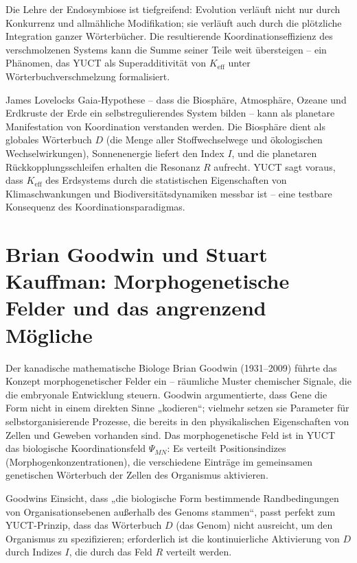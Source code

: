 \documentclass[12pt,a4paper]{article}
\begin{document}
	Die Lehre der Endosymbiose ist tiefgreifend: Evolution verläuft nicht nur durch Konkurrenz und allmähliche Modifikation; sie verläuft auch durch die plötzliche Integration ganzer Wörterbücher. Die resultierende Koordinationseffizienz des verschmolzenen Systems kann die Summe seiner Teile weit übersteigen – ein Phänomen, das YUCT als Superadditivität von \(K_{\mathrm{eff}}\) unter Wörterbuchverschmelzung formalisiert.
	
	James Lovelocks Gaia-Hypothese – dass die Biosphäre, Atmosphäre, Ozeane und Erdkruste der Erde ein selbstregulierendes System bilden – kann als planetare Manifestation von Koordination verstanden werden. Die Biosphäre dient als globales Wörterbuch \(D\) (die Menge aller Stoffwechselwege und ökologischen Wechselwirkungen), Sonnenenergie liefert den Index \(I\), und die planetaren Rückkopplungsschleifen erhalten die Resonanz \(R\) aufrecht. YUCT sagt voraus, dass \(K_{\mathrm{eff}}\) des Erdsystems durch die statistischen Eigenschaften von Klimaschwankungen und Biodiversitätsdynamiken messbar ist – eine testbare Konsequenz des Koordinationsparadigmas.
	
	\section{Brian Goodwin und Stuart Kauffman: Morphogenetische Felder und das angrenzend Mögliche}
	
	Der kanadische mathematische Biologe Brian Goodwin (1931–2009) führte das Konzept morphogenetischer Felder ein – räumliche Muster chemischer Signale, die die embryonale Entwicklung steuern. Goodwin argumentierte, dass Gene die Form nicht in einem direkten Sinne „kodieren“; vielmehr setzen sie Parameter für selbstorganisierende Prozesse, die bereits in den physikalischen Eigenschaften von Zellen und Geweben vorhanden sind. Das morphogenetische Feld ist in YUCT das biologische Koordinationsfeld \(\Psi_{MN}\): Es verteilt Positionsindizes (Morphogenkonzentrationen), die verschiedene Einträge im gemeinsamen genetischen Wörterbuch der Zellen des Organismus aktivieren.
	
	Goodwins Einsicht, dass „die biologische Form bestimmende Randbedingungen von Organisationsebenen außerhalb des Genoms stammen“, passt perfekt zum YUCT-Prinzip, dass das Wörterbuch \(D\) (das Genom) nicht ausreicht, um den Organismus zu spezifizieren; erforderlich ist die kontinuierliche Aktivierung von \(D\) durch Indizes \(I\), die durch das Feld \(R\) verteilt werden.
	
\end{document}
